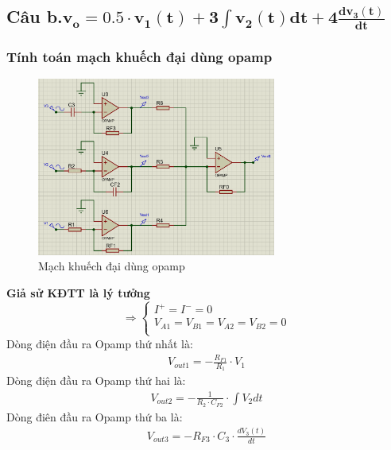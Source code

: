 		\subsection{Câu b.$\mathbf{v_o = 0.5 \cdot v_1(t) + 3 \int v_2(t)dt + 4\frac{dv_3(t)}{dt}}$}
			\subsubsection{Tính toán mạch khuếch đại dùng opamp}
				\begin{figure}[H]
					\centering
					\includegraphics[width=0.7\textwidth]{pictures/topic1_b.png}
					\caption{Mạch khuếch đại dùng opamp}					
					\label{fig:circuit_simulation}
				\end{figure}
				\hspace*{0.6cm}\textbf{Giả sử KĐTT là lý tưởng}
				\[
				\Rightarrow
				\begin{cases}
					I^+ = I^- = 0\\
					V_{A1} = V_{B1} = V_{A2} = V_{B2} = 0\\
				\end{cases}
				\]
				\hspace*{0.6cm}Dòng điện đầu ra Opamp thứ nhất là:
				\begin{align}
					V_{out1} = -\frac{R_{F1}}{R_1} \cdot V_1
				\end{align}
				\hspace*{0.6cm}Dòng điện đầu ra Opamp thứ hai là:
				\begin{align}
					V_{out2} = -\frac{1}{R_2 \cdot C_{F2}} \cdot \int V_{2} dt
				\end{align}
				\hspace*{0.6cm}Dòng điên đầu ra Opamp thứ ba là:
				\begin{align}
					V_{out3} = -R_{F3} \cdot C_{3} \cdot \frac{dV_{3}(t)}{dt}
				\end{align}
